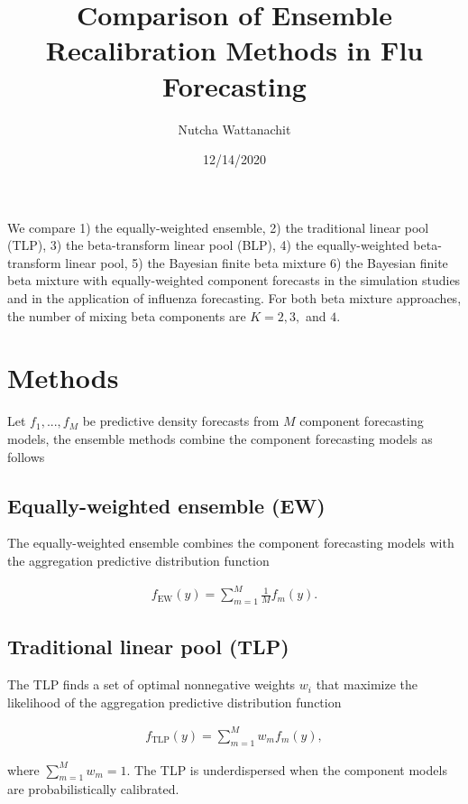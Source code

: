 \documentclass[
]{article}
\title{Comparison of Ensemble Recalibration Methods in Flu Forecasting}
\author{Nutcha Wattanachit}
\date{12/14/2020}
\begin{document}
\maketitle

We compare 1) the equally-weighted ensemble, 2) the traditional linear
pool (TLP), 3) the beta-transform linear pool (BLP), 4) the
equally-weighted beta-transform linear pool, 5) the Bayesian finite beta
mixture 6) the Bayesian finite beta mixture with equally-weighted
component forecasts in the simulation studies and in the application of
influenza forecasting. For both beta mixture approaches, the number of
mixing beta components are \(K=2,3,\) and \(4\).

\hypertarget{methods}{%
\section{Methods}\label{methods}}

Let \(f_1,...,f_M\) be predictive density forecasts from \(M\) component
forecasting models, the ensemble methods combine the component
forecasting models as follows

\hypertarget{equally-weighted-ensemble-ew}{%
\subsection{Equally-weighted ensemble
(EW)}\label{equally-weighted-ensemble-ew}}

The equally-weighted ensemble combines the component forecasting models
with the aggregation predictive distribution function

\begin{align}
f_{\text{EW}}(y)=\sum_{m=1}^M \frac{1}{M}f_m(y).
\end{align}

\hypertarget{traditional-linear-pool-tlp}{%
\subsection{Traditional linear pool
(TLP)}\label{traditional-linear-pool-tlp}}

The TLP finds a set of optimal nonnegative weights \(w_i\) that maximize
the likelihood of the aggregation predictive distribution function

\begin{align}
f_{\text{TLP}}(y)=\sum_{m=1}^M w_mf_m(y),
\end{align}

where \(\sum_{m=1}^M w_m=1\). The TLP is underdispersed when the
component models are probabilistically calibrated.
\end{document}
